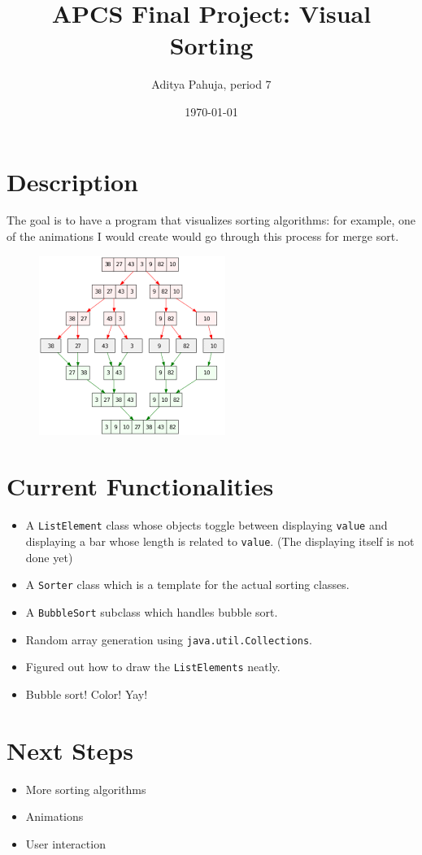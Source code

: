 \documentclass{scrartcl}
\title{APCS Final Project: Visual Sorting}
\author{Aditya Pahuja, period 7}
\date{\today}
\providecommand{\ii}{\item}
\begin{document}
\maketitle

\section{Description}
The goal is to have a program that visualizes sorting algorithms:
for example, one of the animations I would create would go through
this process for merge sort.
\begin{figure}[h]
	\centering
	\includegraphics{mergeSort}
\end{figure}

\section{Current Functionalities}
\begin{itemize}
	\ii A \texttt{ListElement} class whose objects toggle between
	displaying \texttt{value} and displaying a bar whose length
	is related to \texttt{value}. (The displaying itself is not done yet)
	\ii A \texttt{Sorter} class which is a template for
	the actual sorting classes.
	\ii A \texttt{BubbleSort} subclass which handles bubble sort.
	\ii Random array generation using \texttt{java.util.Collections}.
	\ii Figured out how to draw the \texttt{ListElements} neatly.
	\ii Bubble sort! Color! Yay!
\end{itemize}

\section{Next Steps}
\begin{itemize}
	\ii More sorting algorithms
	\ii Animations
	\ii User interaction
\end{itemize}
\end{document}
